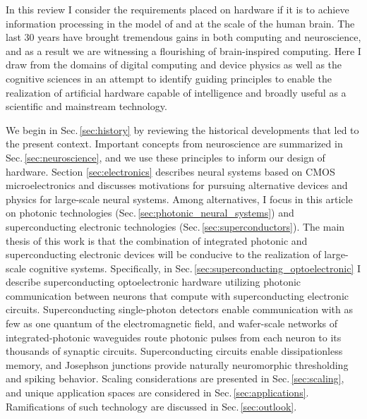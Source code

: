 \documentclass[twocolumn]{article}
\begin{document}
In this review I consider the requirements placed on hardware if it is to achieve information processing in the model of and at the scale of the human brain. The last 30 years have brought tremendous gains in both computing and neuroscience, and as a result we are witnessing a flourishing of brain-inspired computing. Here I draw from the domains of digital computing and device physics as well as the cognitive sciences in an attempt to identify guiding principles to enable the realization of artificial hardware capable of intelligence and broadly useful as a scientific and mainstream technology.

We begin in Sec.\,\ref{sec:history} by reviewing the historical developments that led to the present context. Important concepts from neuroscience are summarized in Sec.\,\ref{sec:neuroscience}, and we use these principles to inform our design of hardware. Section \ref{sec:electronics} describes neural systems based on CMOS microelectronics and discusses motivations for pursuing alternative devices and physics for large-scale neural systems. Among alternatives, I focus in this article on photonic technologies (Sec.\,\ref{sec:photonic_neural_systems}) and superconducting electronic technologies (Sec.\,\ref{sec:superconductors}). The main thesis of this work is that the combination of integrated photonic and superconducting electronic devices will be conducive to the realization of large-scale cognitive systems. Specifically, in Sec.\,\ref{sec:superconducting_optoelectronic} I describe superconducting optoelectronic hardware utilizing photonic communication between neurons that compute with superconducting electronic circuits. Superconducting single-photon detectors enable communication with as few as one quantum of the electromagnetic field, and wafer-scale networks of integrated-photonic waveguides route photonic pulses from each neuron to its thousands of synaptic circuits. Superconducting circuits enable dissipationless memory, and Josephson junctions provide naturally neuromorphic thresholding and spiking behavior. Scaling considerations are presented in Sec.\,\ref{sec:scaling}, and unique application spaces are considered in Sec.\,\ref{sec:applications}. Ramifications of such technology are discussed in Sec.\,\ref{sec:outlook}.
\end{document}
